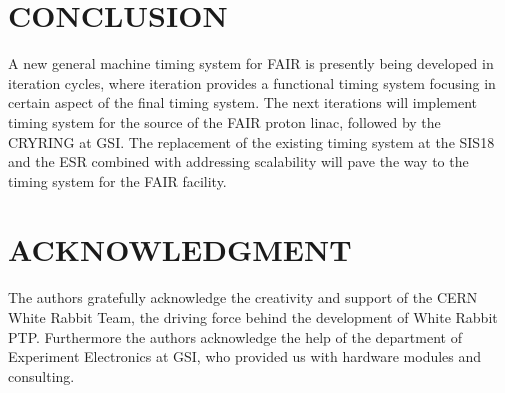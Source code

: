 \section{CONCLUSION}

A new general machine timing system for FAIR is presently being developed in
iteration cycles, where iteration provides a functional timing system
focusing in certain aspect of the final timing system. 
The next iterations  will implement timing system  for the source of the FAIR proton linac, 
followed by the CRYRING at GSI. The replacement of the existing timing 
system at the SIS18 and the ESR combined with addressing scalability will 
pave the way to the timing system for the FAIR facility.

\section{ACKNOWLEDGMENT}
The authors gratefully acknowledge the creativity and
support of the CERN White Rabbit Team, the driving force
behind the development of White Rabbit PTP. Furthermore
the authors acknowledge the help of the department of 
Experiment Electronics at GSI, who provided us with hardware modules and consulting.



